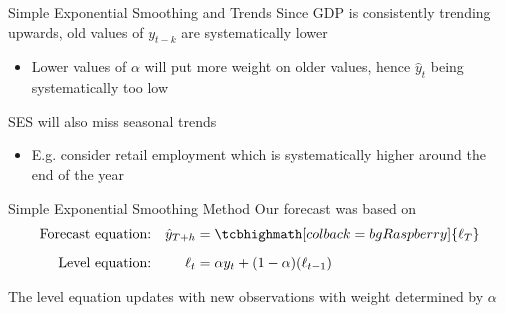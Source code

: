 \documentclass[aspectratio=169,t,11pt,table]{beamer}
\begin{document}

\begin{frame}{Simple Exponential Smoothing and Trends}
  Since GDP is consistently trending upwards, old values of $y_{t-k}$ are systematically lower
  \begin{itemize}
    \item Lower values of $\alpha$ will put more weight on older values, hence $\hat{y}_t$ being systematically too low
  \end{itemize}

  \bigskip
  SES will also miss seasonal trends
  \begin{itemize}
    \item E.g. consider retail employment which is systematically higher around the end of the year
  \end{itemize}
\end{frame}


% 

\begin{frame}{Simple Exponential Smoothing Method}
  Our forecast was based on
  \begin{align*}
    \text{Forecast equation:} && \hat{y}_{T+h} &= \tcbhighmath[colback = bgRaspberry]{\ell_{T}} \\[2mm]
    \text{Level equation:}    && \ell_{t} &= \alpha y_{t} + (1 - \alpha)(\ell_{t-1}) 
  \end{align*}
  
  \bigskip
  The level equation updates with new observations with weight determined by $\alpha$
\end{frame}
\end{document}
